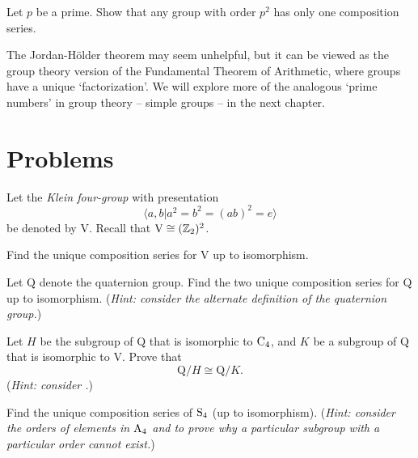 \begin{exercise}
    Let $p$ be a prime. Show that any group with order $p^2$ has only one composition series.
\end{exercise}

The Jordan-H\"older theorem may seem unhelpful, but it can be viewed as the group theory version of the Fundamental Theorem of Arithmetic, where groups have a unique `factorization'. We will explore more of the analogous `prime numbers' in group theory -- simple groups -- in the next chapter.

\newpage

\section{Problems}
\begin{problem}
    Let the \textit{Klein four-group} with presentation
    \[
        \langle a, b \vert a^2 = b^2 = (ab)^2 = e \rangle
    \]
    be denoted by $\mathrm{V}$. Recall that $\mathrm{V} \cong (\mathbb{Z}_2)^2$.
    \begin{partquestions}{\roman*}
        \item Find the unique composition series for $\mathrm{V}$ up to isomorphism.
        \item Let $\mathrm{Q}$ denote the quaternion group. Find the two unique composition series for $\mathrm{Q}$ up to isomorphism.\newline
        (\textit{Hint: consider the alternate definition of the quaternion group.})
        \item Let $H$ be the subgroup of $\mathrm{Q}$ that is isomorphic to $\mathrm{C}_{4}$, and $K$ be a subgroup of $\mathrm{Q}$ that is isomorphic to $\mathrm{V}$. Prove that
        \[
            \mathrm{Q}/H \cong \mathrm{Q}/K.
        \]
        (\textit{Hint: consider .})
    \end{partquestions}
\end{problem}

\begin{problem}\label{problem-S4-composition-series}
    Find the unique composition series of $\mathrm{S}_{4}$ (up to isomorphism).\newline
    (\textit{Hint: consider the orders of elements in $\mathrm{A}_{4}$ and  to prove why a particular subgroup with a particular order cannot exist.})
\end{problem}
